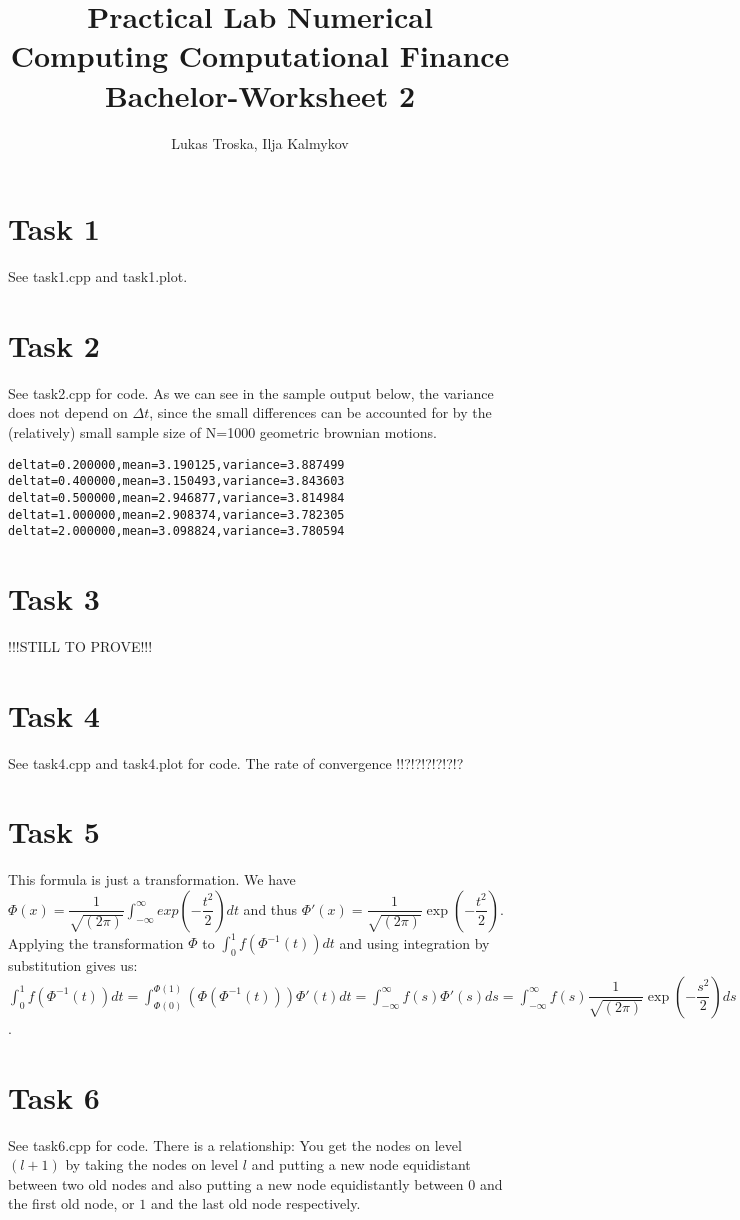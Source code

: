 \documentclass[]{article}
\title{Practical Lab Numerical Computing Computational Finance \\Bachelor-Worksheet 2}
\author{Lukas Troska, Ilja Kalmykov}
\date{}
\begin{document}
\maketitle
\section*{Task 1}
See task1.cpp and task1.plot.

\section*{Task 2}
See task2.cpp for code. As we can see in the sample output below, the variance does not depend on $\Delta t$, since the small differences can be accounted for by the (relatively) small sample size of N=1000 geometric brownian motions.
\begin{lstlisting}[frame=single] 
deltat=0.200000,mean=3.190125,variance=3.887499
deltat=0.400000,mean=3.150493,variance=3.843603
deltat=0.500000,mean=2.946877,variance=3.814984
deltat=1.000000,mean=2.908374,variance=3.782305
deltat=2.000000,mean=3.098824,variance=3.780594
\end{lstlisting}


\section*{Task 3}
!!!STILL TO PROVE!!!

\section*{Task 4}
See task4.cpp and task4.plot for code. The rate of convergence !!?!?!?!?!?!?


\section*{Task 5}
This formula is just a transformation. We have $\Phi(x)=\dfrac{1}{\sqrt{(2\pi)}}\int_{-\infty}^\infty exp({-\dfrac{t^2}{2}})dt$ and thus $\Phi'(x)=\dfrac{1}{\sqrt{(2\pi)}}\exp({-\dfrac{t^2}{2}})$. Applying the transformation $\Phi$ to $\int_0^1f(\Phi^{-1}(t))dt$ and using integration by substitution gives us: $\int_0^1f(\Phi^{-1}(t))dt=\int_{\Phi(0)}^{\Phi(1)}(\Phi(\Phi^{-1}(t)))\Phi'(t)dt=\int_{-\infty}^{\infty}f(s)\Phi'(s)ds=\int_{-\infty}^{\infty}f(s)\dfrac{1}{\sqrt{(2\pi)}}\exp({-\dfrac{s^2}{2}})ds=\dfrac{1}{\sqrt{(2\pi)}}\int_{-\infty}^{\infty}f(s)\exp({-\dfrac{s^2}{2}})ds$.

\section*{Task 6}
See task6.cpp for code. There is a relationship: You get the nodes on level $(l+1)$ by taking the nodes on level $l$ and putting a new node equidistant between two old nodes and also putting a new node equidistantly between $0$ and the first old node, or $1$ and the last old node respectively.
\end{document}
